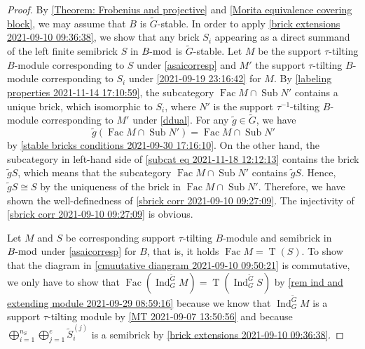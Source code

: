 \documentclass[pdftex,a4paper]{article}
\numberwithin{equation}{subsection}
\theoremstyle{definition}
\newcommand{\lmod}{\operatorname{\mathrm{\hspace{-2pt}-mod}}}
\newcommand{\induc}{{\operatorname{Ind}\nolimits}}
\newcommand{\Fac}{\operatorname{\mathrm{Fac}}}
\newcommand{\Sub}{\operatorname{\mathrm{Sub}}}
\newcommand{\torscl}{\operatorname{\mathrm{T}}}
\begin{document}
\begin{proof}
	By \cref{Theorem: Frobenius and projective} and \cref{Morita equivalence covering block}, we may assume that \(B\) is \(\tilde{G}\)-stable.
	In order to apply \cref{brick extensions 2021-09-10 09:36:38}, we show that any brick \(S_i\) appearing as a direct summand of the left finite semibrick \(S\) in \(B\lmod\) is \(\tilde{G}\)-stable.
	Let \(M\) be the support \(\tau\)-tilting \(B\)-module corresponding to \(S\) under \eqref{asaicorresp} and \(M'\) the support \(\tau\)-tilting \(B\)-module corresponding to \(S_i\) under \eqref{2021-09-19 23:16:42} for \(M\).
	By \cref{labeling properties 2021-11-14 17:10:59}, the subcategory \(\Fac M\cap \Sub N'\) contains a unique brick, which isomorphic to \(S_i\), where \(N'\) is the support \(\tau^{-1}\)-tilting \(B\)-module corresponding to \(M'\) under \eqref{ddual}.
	For any \(\tilde{g}\in \tilde{G}\), we have \begin{equation}\label{subcat eq 2021-11-18 12:12:13}
		\tilde{g}(\Fac M\cap \Sub N')=\Fac M\cap \Sub N'
	\end{equation}
	by \cref{stable bricks conditions 2021-09-30 17:16:10}.
	On the other hand, the subcategory in left-hand side of \eqref{subcat eq 2021-11-18 12:12:13} contains the brick \(\tilde{g}S\), which means that the subcategory \(\Fac M\cap \Sub N'\) contains \(\tilde{g}S\).
	Hence, \(\tilde{g} S \cong S\) by the uniqueness of the brick in \(\Fac M\cap \Sub N'\).
	Therefore, we have shown the well-definedness of \eqref{sbrick corr 2021-09-10 09:27:09}. The injectivity of \eqref{sbrick corr 2021-09-10 09:27:09} is obvious.

	Let \(M\) and \(S\) be corresponding support \(\tau\)-tilting \(B\)-module and semibrick in \(B\lmod\) under \eqref{asaicorresp} for \(B\), that is, it holds \(\Fac M=\torscl(S)\).
	To show that the diagram in \ref{cmuutative diangram 2021-09-10 09:50:21} is commutative,
	we only have to show that
	\(\Fac (\induc_G^{\tilde{G}}M)=\torscl(\induc_G^{\tilde{G}}S)\) by \cref{rem ind and extending module 2021-09-29 08:59:16} because we know that \(\induc_G^{\tilde{G}}M\) is a support \(\tau\)-tilting module by \cref{MT 2021-09-07 13:50:56} and because \(\bigoplus_{i=1}^{n_S}\bigoplus_{j=1}^{e}\tilde{S}_i^{(j)}\) is a semibrick by \cref{brick extensions 2021-09-10 09:36:38}.


\end{proof}
\end{document}
